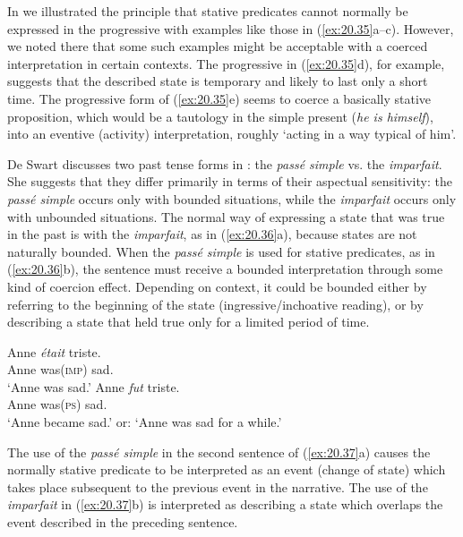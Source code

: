 In  we illustrated the principle that stative predicates cannot normally be expressed in the progressive with examples like those in (\ref{ex:20.35}a--c). However, we noted there that some such examples might be acceptable with a coerced interpretation in certain contexts. The progressive in (\ref{ex:20.35}d), for example, suggests that the described state is temporary and likely to last only a short time. The progressive form of (\ref{ex:20.35}e) seems to coerce a basically stative proposition, which would be a tautology in the simple present (\textit{he is himself}), into an eventive (activity) interpretation, roughly ‘acting in a way typical of him’.


\ea \label{ex:20.35}
                       \z
\z


De Swart discusses two past tense forms in : the \textit{passé simple} vs. the \textit{imparfait}. She suggests that they differ primarily in terms of their aspectual sensitivity: the \textit{passé simple} occurs only with bounded situations, while the \textit{imparfait} occurs only with unbounded situations. The normal way of expressing a state that was true in the past is with the \textit{imparfait}, as in (\ref{ex:20.36}a), because states are not naturally bounded. When the \textit{passé simple} is used for stative predicates, as in (\ref{ex:20.36}b), the sentence must receive a bounded interpretation through some kind of coercion effect. Depending on context, it could be bounded either by referring to the beginning of the state (ingressive/inchoative reading), or by describing a state that held true only for a limited period of time.


\ea \label{ex:20.36}
\ea  \gll  Anne  \textit{était}  triste.\\
Anne  was(\textsc{imp})  sad.\\
\glt ‘Anne was sad.’
\ex \gll Anne  \textit{fut}  triste.\\
Anne  was(\textsc{ps})  sad.\\
\glt ‘Anne became sad.’ or: ‘Anne was sad for a while.’
\z \z


The use of the \textit{passé simple} in the second sentence of (\ref{ex:20.37}a) causes the normally stative predicate to be interpreted as an event (change of state) which takes place subsequent to the previous event in the narrative. The use of the \textit{imparfait} in (\ref{ex:20.37}b) is interpreted as describing a state which overlaps the event described in the preceding sentence.


